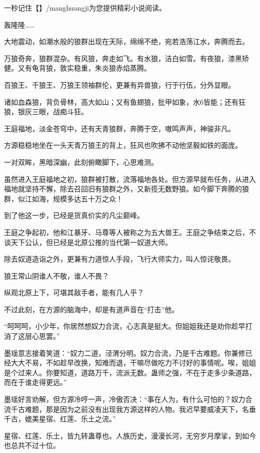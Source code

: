 
\begin{this_body}

一秒记住【】/manghuangji为您提供精彩小说阅读。

轰隆隆……

大地震动，如潮水般的狼群出现在天际，绵绵不绝，宛若浩荡江水，奔腾而去。

万狼奇奔，狼群混杂。有风狼，奔走如飞。有水狼，洁白如雪。有夜狼，漆黑矫健。又有龟背狼，敦实稳重，朱炎狼赤焰蒸腾。

百狼王、千狼王、万狼王领袖群伦，更兼有异兽狼，行于行伍，分外显眼。

诸如血森狼，背负骨林，高大如山；又有鱼翅狼，批甲如象，水6皆能；还有狂狼，银灰三眼，战痴斗狂。

王庭福地，淡金苍穹中，还有天青狼群，奔腾于空，嗷鸣声声，神骏非凡。

方源稳稳地坐在一头天青万狼王的背上，狂风也吹拂不动他坚毅如铁的面庞。

一对双眸，黑暗深幽，此刻俯瞰脚下，心思难测。

虽然进入王庭福地之初，狼群被打散，流落福地各处。但方源早就布任务，从进入福地就坚持不懈，除去召回旧有狼群之外，又新揽无数野狼。如今脚下奔腾的狼群，似江如海，规模多达五十万之众！

到了他这一步，已经是货真价实的凡尘巅峰。

王庭之争起初，他和江暴牙、马尊等人被称之为五大兽王。王庭之争结束之后，不谈天下公认，但已经是北原公推的当代第一奴道大师。

除去奴道造诣之外，更兼有力道惊人手段，飞行大师实力，叫人惊诧敬畏。

狼王常山阴谁人不敬，谁人不畏？

纵观北原上下，可堪其敌手者，能有几人乎？

不过此刻，在方源的脑海中，却是有道声音在“打击”他。

“呵呵呵，小少年，你居然想奴力合流，心志真是挺大。但姐姐我还是劝你趁早打消了这层心思罢。”

墨瑶意志接着笑道：“奴力二道，泾渭分明。奴力合流，乃是千古难题。你兼修已经大大不易，不如趁早改换，知难而退，干嘛尽做吃力不讨好的事情呢。唉，姐姐是个过来人。你要知道，道路万千，流派无数。蛊师之强，不在于走多少条道路，而在于谁走得更远。”

墨瑶好言劝解，但方源冷哼一声，冷傲否决：“事在人为，有什么可怕的？奴力合流千古难题，那是因为之前没有出现我方源这样的人物。我迟早要威凌天下，名垂千古，媲美星宿、红莲、乐土之流。”

星宿、红莲、乐土，皆九转蛊尊也。人族历史，漫漫长河，无穷岁月摩挲，到如今也总共不过十位。


\end{this_body}
